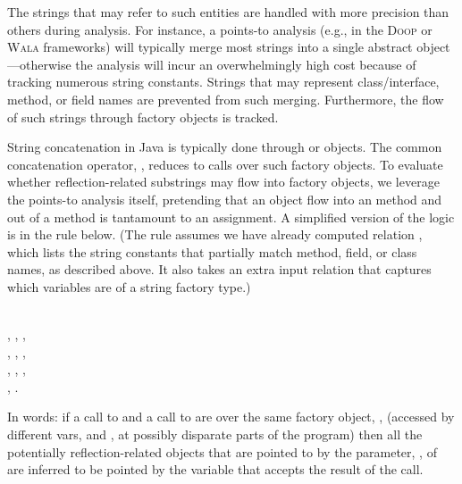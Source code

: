 The strings that may refer to such entities are handled with more
precision than others during analysis. For instance, a points-to
analysis (e.g., in the \textsc{Doop} or \textsc{Wala} frameworks) will
typically merge most strings into a single abstract object---otherwise
the analysis will incur an overwhelmingly high cost because of tracking numerous
string constants. Strings that may represent class/interface, method,
or field names are prevented from such merging. Furthermore, the flow
of such strings through factory objects is tracked.

String concatenation in Java is typically done through
 or  objects. The
common concatenation operator, \code{+}, reduces to calls over
such factory objects. To evaluate whether reflection-related
substrings may flow into factory objects, we leverage the points-to
analysis itself, pretending that an object flow into an 
method and out of a  method is tantamount to an
assignment. A simplified version of the logic is in the rule below.
(The rule assumes we have already computed relation
, which lists the string constants that
partially match method, field, or class names, as described above. It
also takes an extra input relation 
that captures which variables are of a string factory type.)

\begin{rules}
  \\
\tab {}, , , \\
\tab {}, , 
     , \\
\tab {}, , , \\
\tab {}, .\\
\end{rules}

\noindent In words: if a call to  and a call to  are
over the same factory object, , (accessed by different
vars,  and , at possibly disparate parts of
the program) then all the potentially reflection-related objects that
are pointed to by the parameter, , of  are inferred
to be pointed by the variable  that accepts the result of the
 call.

